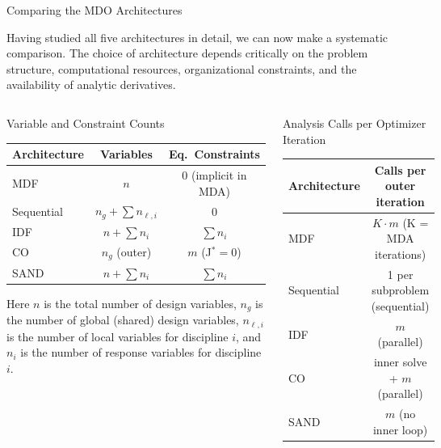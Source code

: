 \documentclass[aspectratio=169,10pt]{beamer}
\begin{document}
\begin{frame}[allowframebreaks]{Comparing the MDO Architectures}

  Having studied all five architectures in detail, we can now make a
  systematic comparison.  The choice of architecture depends critically
  on the problem structure, computational resources, organizational
  constraints, and the availability of analytic derivatives.

  \begin{columns}[T]
    \begin{block}{Variable and Constraint Counts}
      \begin{tabular}{@{}lcc@{}}
        \toprule
        Architecture & Variables & Eq.\ Constraints \\
        \midrule
        MDF      & $n$                          & 0 (implicit in MDA) \\
        Sequential & $n_g + \sum n_{\ell,i}$   & 0 \\
        IDF      & $n + \sum n_i$               & $\sum n_i$ \\
        CO       & $n_g$ (outer)                & $m$ (J$^*=0$) \\
        SAND     & $n + \sum n_i$               & $\sum n_i$ \\
        \bottomrule
      \end{tabular}

      \medskip
      \small Here $n$ is the total number of design variables, $n_g$ is
      the number of global (shared) design variables, $n_{\ell,i}$ is
      the number of local variables for discipline $i$, and $n_i$ is the
      number of response variables for discipline $i$.
    \end{block}

    \begin{block}{Analysis Calls per Optimizer Iteration}
      \begin{tabular}{@{}lc@{}}
        \toprule
        Architecture & Calls per outer iteration \\
        \midrule
        MDF      & $K \cdot m$ (K = MDA iterations) \\
        Sequential & 1 per subproblem (sequential) \\
        IDF      & $m$ (parallel) \\
        CO       & inner solve + $m$ (parallel) \\
        SAND     & $m$ (no inner loop) \\
        \bottomrule
      \end{tabular}


\end{block}
\end{columns}
\end{frame}
\end{document}
